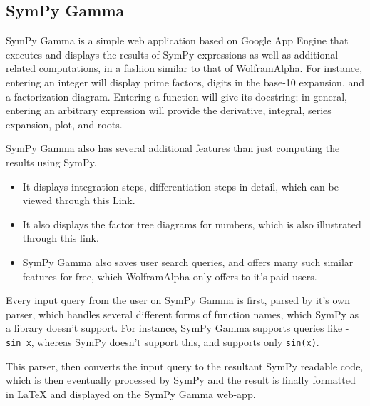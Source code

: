 \subsection{SymPy Gamma}\label{sympy-gamma}

SymPy Gamma is a simple web application based on Google App Engine that 
executes and displays the results of SymPy expressions as well as
additional related computations, in a fashion similar to that of
Wolfram\textbar{}Alpha. For instance, entering an integer will display
prime factors, digits in the base-10 expansion, and a factorization
diagram. Entering a function will give its docstring; in general,
entering an arbitrary expression will provide the derivative, integral,
series expansion, plot, and roots.

SymPy Gamma also has several additional features than just computing the
results using SymPy.

\begin{itemize}
\item
  It displays integration steps, differentiation steps in detail, which
  can be viewed through this
  \href{http://www.sympygamma.com/input/?i=integrate\%281\%20/\%28\%28x\%2B1\%29\%28x\%2B3\%29\%28x\%2B5\%29\%29\%29}{Link}.
\item
  It also displays the factor tree diagrams for numbers, which is also
  illustrated through this
  \href{http://www.sympygamma.com/input/?i=112}{link}.
\item
  SymPy Gamma also saves user search queries, and offers many such 
  similar features for free, which Wolfram\textbar{}Alpha only offers 
  to it's paid users.
\end{itemize}
Every input query from the user on SymPy Gamma is first, parsed by it's
own parser, which handles several different forms of function names,
which SymPy as a library doesn't support. For instance, SymPy Gamma
supports queries like - \texttt{sin\ x}, whereas SymPy doesn't support
this, and supports only \texttt{sin(x)}.

This parser, then converts the input query to the resultant SymPy
readable code, which is then eventually processed by SymPy and the
result is finally formatted in LaTeX and displayed on the SymPy Gamma
web-app.